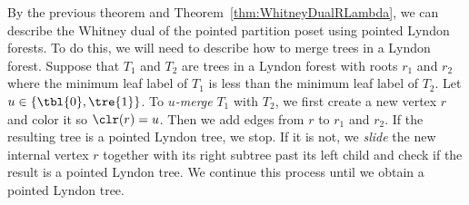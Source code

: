  By the previous theorem and Theorem~\ref{thm:WhitneyDualRLambda}, we can describe the Whitney dual of the pointed partition poset using pointed Lyndon forests.  To do this, we will need to describe how to merge trees in a Lyndon forest. Suppose that $T_1$ and $T_2$ are trees in a Lyndon forest with roots $r_1$ and $r_2$ where  the minimum leaf label of $T_1$ is less than the minimum leaf label of $T_2$.  Let $u\in \{\tbl{0},\tre{1}\}$.   To \emph{$u$-merge} $T_1$ with $T_2$, we first create a new vertex $r$ and color it so $\clr(r)=u$. Then we add edges from $r$ to $r_1$ and $r_2$.   If the resulting tree is a pointed Lyndon tree, we stop.  If it is not, we  \emph{slide} the new internal vertex $r$ together with its right subtree  past its left child and check if the result is a pointed Lyndon tree.  We continue this process until we obtain a pointed Lyndon tree.  
 

